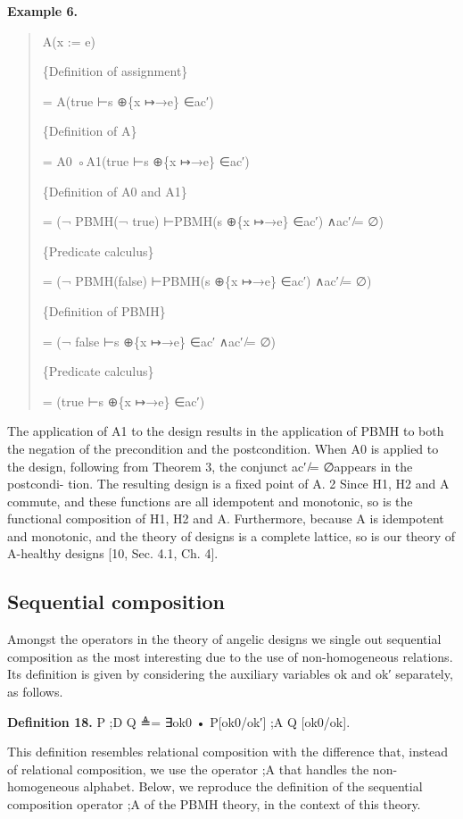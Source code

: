 \documentclass[11pt]{article}
\begin{document}
\noindent\textbf{Example 6.}


\begin{quote}\small\raggedright
A(x := e)
\par
\{Definition of assignment\}
\par
= A(true ⊢s ⊕\{x ↦→e\} ∈ac′)
\par
\{Definition of A\}
\par
= A0 ◦A1(true ⊢s ⊕\{x ↦→e\} ∈ac′)
\par
\{Definition of A0 and A1\}
\par
= (¬ PBMH(¬ true) ⊢PBMH(s ⊕\{x ↦→e\} ∈ac′) ∧ac′ ̸= ∅)
\par
\{Predicate calculus\}
\par
= (¬ PBMH(false) ⊢PBMH(s ⊕\{x ↦→e\} ∈ac′) ∧ac′ ̸= ∅)
\par
\{Definition of PBMH\}
\par
= (¬ false ⊢s ⊕\{x ↦→e\} ∈ac′ ∧ac′ ̸= ∅)
\par
\{Predicate calculus\}
\par
= (true ⊢s ⊕\{x ↦→e\} ∈ac′)
\end{quote}

The application of A1 to the design results in the application of PBMH to both the negation of the precondition and the postcondition. When A0 is applied to the design, following from Theorem 3, the conjunct ac′ ̸= ∅appears in the postcondi- tion. The resulting design is a fixed point of A. 2 Since H1, H2 and A commute, and these functions are all idempotent and monotonic, so is the functional composition of H1, H2 and A. Furthermore, because A is idempotent and monotonic, and the theory of designs is a complete lattice, so is our theory of A-healthy designs [10, Sec. 4.1, Ch. 4].

\subsection{Sequential composition}
Amongst the operators in the theory of angelic designs we single out sequential composition as the most interesting due to the use of non-homogeneous relations. Its definition is given by considering the auxiliary variables ok and ok′ separately, as follows.

\noindent\textbf{Definition 18.} P ;D Q ≜= ∃ok0 • P[ok0/ok′] ;A Q [ok0/ok].


This definition resembles relational composition with the difference that, instead of relational composition, we use the operator ;A that handles the non-homogeneous alphabet. Below, we reproduce the definition of the sequential composition operator ;A of the PBMH theory, in the context of this theory.
\end{document}
